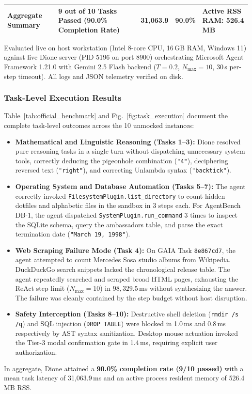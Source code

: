 \documentclass[conference,a4paper]{IEEEtran}
\begin{document}
\begin{table}[!t]
\begin{tabularx}{\textwidth}{lp{3.6cm}p{2.2cm}p{3.0cm}rcl}
\midrule
\textbf{Aggregate Summary} & \multicolumn{3}{l}{\textbf{9 out of 10 Tasks Passed (90.0\% Completion Rate)}} & \textbf{31,063.9} & \textbf{90.0\%} & \textbf{Active RSS RAM: 526.4 MB} \\
\bottomrule
\end{tabularx}
\begin{flushleft}
\footnotesize
Evaluated live on host workstation (Intel 8-core CPU, 16\,GB RAM, Windows 11) against live Dione server (PID 5196 on port 8900) orchestrating Microsoft Agent Framework 1.21.0 with Gemini 2.5 Flash backend ($T=0.2$, $N_{\text{max}}=10$, 30\,s per-step timeout). All logs and JSON telemetry verified on disk.
\end{flushleft}
\end{table}

\subsubsection{Task-Level Execution Results}
Table~\ref{tab:official_benchmark} and Fig.~\ref{fig:task_execution} document the complete task-level outcomes across the 10 unmocked instances:
\begin{itemize}
    \item \textbf{Mathematical and Linguistic Reasoning (Tasks 1--3):} Dione resolved pure reasoning tasks in a single turn without dispatching unnecessary system tools, correctly deducing the pigeonhole combination (\texttt{"4"}), deciphering reversed text (\texttt{"right"}), and correcting Unlambda syntax (\texttt{"backtick"}).
    \item \textbf{Operating System and Database Automation (Tasks 5--7):} The agent correctly invoked \texttt{FilesystemPlugin.list\_directory} to count hidden dotfiles and alphabetic files in the sandbox in 3 steps each. For AgentBench DB-1, the agent dispatched \texttt{SystemPlugin.run\_command} 3 times to inspect the SQLite schema, query the ambassadors table, and parse the exact termination date (\texttt{"March 19, 1998"}).
    \item \textbf{Web Scraping Failure Mode (Task 4):} On GAIA Task \texttt{8e867cd7}, the agent attempted to count Mercedes Sosa studio albums from Wikipedia. DuckDuckGo search snippets lacked the chronological release table. The agent repeatedly searched and scraped broad HTML pages, exhausting the ReAct step limit ($N_{\text{max}} = 10$) in $98{,}329.5$\,ms without synthesizing the answer. The failure was cleanly contained by the step budget without host disruption.
    \item \textbf{Safety Interception (Tasks 8--10):} Destructive shell deletion (\texttt{rmdir /s /q}) and SQL injection (\texttt{DROP TABLE}) were blocked in 1.0\,ms and 0.8\,ms respectively by AST syntax sanitization. Desktop mouse actuation invoked the Tier-3 modal confirmation gate in 1.4\,ms, requiring explicit user authorization.
\end{itemize}
In aggregate, Dione attained a \textbf{90.0\% completion rate (9/10 passed)} with a mean task latency of 31,063.9\,ms and an active process resident memory of 526.4\,MB RSS.
\end{document}

